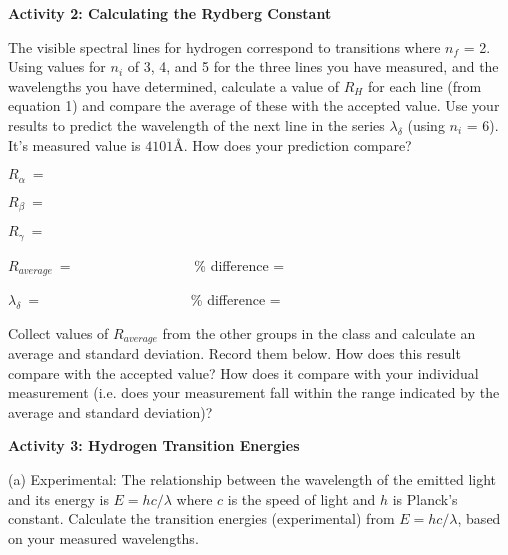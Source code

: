 \vspace{0.5in}

\textbf{Activity 2: Calculating the Rydberg Constant}

 
The visible spectral lines for hydrogen correspond to transitions where $n_f$ = 2.  Using values for $n_i$ of 3, 4, and 5 for the three lines you have measured, and the wavelengths you have determined, calculate a value of $R_H$ for each line (from equation 1) and compare the average of these with the accepted value.  
Use your results to predict the wavelength of the next line in the series $\lambda_\delta$ (using $n_i$ = 6). It's measured value is $4101${\AA}.  
How does your prediction compare?     

\noindent $R_\alpha ~ = ~\qquad\qquad\qquad\qquad\qquad$

\answerspace{0.4in}

\noindent $R_\beta ~ = ~\qquad\qquad\qquad\qquad\qquad$

\answerspace{0.4in}

\noindent $R_\gamma ~ =~ \qquad\qquad\qquad\qquad\qquad$

\answerspace{0.4in}

\noindent $R_{average} ~ =~ \qquad\qquad\qquad\qquad$  \% difference = 

\answerspace{0.4in}

\noindent $\lambda_\delta ~ = ~\qquad\qquad\qquad\qquad\qquad$  \% difference =

\answerspace{0.2in}


Collect values of $R_{average}$ from the other groups in the class and calculate 
an average and standard deviation. Record them below.
How does this result compare with the accepted value?
How does it compare with your individual measurement (i.e. does your 
measurement fall within the range indicated by the average and standard 
deviation)?

\answerspace{1.4in}

\textbf{Activity 3: Hydrogen Transition Energies}

(a)  Experimental:  The relationship between the wavelength of the emitted light and its energy
is $E=hc/\lambda$ where $c$ is the speed of light and $h$ is Planck's constant.  Calculate the transition energies (experimental) from $E=hc/\lambda$, based on your measured wavelengths.


